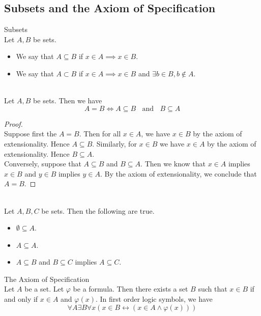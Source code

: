 \documentclass[a4paper]{article}
\begin{document}
\subsection{Subsets and the Axiom of Specification}
\begin{defn}{Subsets}{}\\
Let $A,B$ be sets. 
\begin{itemize}
\item We say that $A\subseteq B$ if $x\in A\implies x\in B$. 
\item We say that $A\subset B$ if $x\in A\implies x\in B$ and $\exists b\in B,b\notin A$. 
\end{itemize}
\end{defn}

\begin{prp}{}{}\\
Let $A,B$ be sets. Then we have $$A=B\iff A\subseteq B\;\;\text{ and }\;\;B\subseteq A$$
\begin{proof}\\
Suppose first the $A=B$. Then for all $x\in A$, we have $x\in B$ by the axiom of extensionality. Hence $A\subseteq B$. Similarly, for $x\in B$ we have $x\in A$ by the axiom of extensionality. Hence $B\subseteq A$. \\

Conversely, suppose that $A\subseteq B$ and $B\subseteq A$. Then we know that $x\in A$ implies $x\in B$ and $y\in B$ implies $y\in A$. By the axiom of extensionality, we conclude that $A=B$. 
\end{proof}
\end{prp}

\begin{prp}{}{}\\
Let $A,B,C$ be sets. Then the following are true. 
\begin{itemize}
\item $\emptyset\subseteq A$. 
\item $A\subseteq A$. 
\item $A\subseteq B$ and $B\subseteq C$ implies $A\subseteq C$. 
\end{itemize}
\end{prp}

\begin{axm}{The Axiom of Specification}{}\\
Let $A$ be a set. Let $\varphi$ be a formula. Then there exists a set $B$ such that $x\in B$ if and only if $x\in A$ and $\varphi(x)$. In first order logic symbols, we have $$\forall A\exists B\forall x(x\in B\leftrightarrow(x\in A\wedge\varphi(x)))$$
\end{axm}
\end{document}
